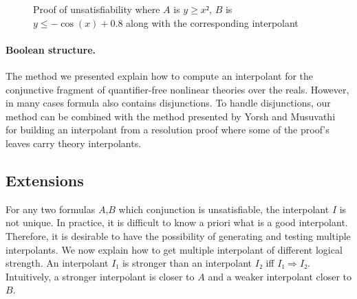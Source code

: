 \begin{example}
\begin{figure}
\caption{Proof of unsatisfiability where $A$ is $y≥x²$, $B$ is $y ≤ -\cos(x) + 0.8$ along with the corresponding interpolant}
\label{fig:proof}
\end{figure}
\end{example}

\paragraph{Boolean structure.}
The method we presented explain how to compute an interpolant for the conjunctive fragment of quantifier-free nonlinear theories over the reals.
However, in many cases formula also contains disjunctions.
To handle disjunctions, our method can be combined with the method presented by Yorsh and Musuvathi~\cite{DBLP:conf/cade/YorshM05} for building an interpolant from a resolution proof where some of the proof's leaves carry theory interpolants.




\subsection{Extensions}

For any two formulas $A$,$B$ which conjunction is unsatisfiable, the interpolant $I$ is not unique.
In practice, it is difficult to know a priori what is a good interpolant.
Therefore, it is desirable to have the possibility of generating and testing multiple interpolants.
We now explain how to get multiple interpolant of different logical strength.
An interpolant $I₁$ is stronger than an interpolant $I₂$ iff $I₁ ⇒ I₂$.
Intuitively, a stronger interpolant is closer to $A$ and a weaker interpolant closer to $B$.

